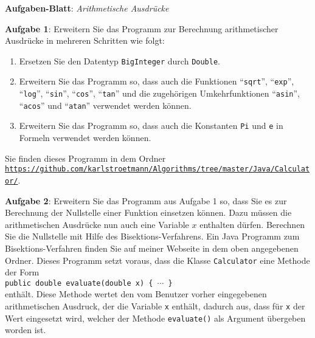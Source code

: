 \documentclass{article}
\begin{document}
\noindent
{\Large \textbf{Aufgaben-Blatt}: \emph{Arithmetische Ausdr\"ucke}}

\vspace{0.5cm}


\noindent
\textbf{Aufgabe 1}: 
Erweitern Sie das Programm zur Berechnung arithmetischer Ausdr\"ucke in mehreren 
Schritten wie folgt:
\begin{enumerate}
\item Ersetzen Sie den Datentyp \texttt{BigInteger} durch \texttt{Double}.
\item Erweitern Sie das Programm so, dass auch die
      Funktionen ``\texttt{sqrt}'', ``\texttt{exp}'', ``\texttt{log}'', ``\texttt{sin}'',
      ``\texttt{cos}'', ``\texttt{tan}'' und die zugeh\"origen Umkehrfunktionen 
      ``\texttt{asin}'', ``\texttt{acos}'' und ``\texttt{atan}''
      verwendet werden
      k\"onnen.
\item Erweitern Sie das Programm so, dass auch die Konstanten \texttt{Pi} und
      \texttt{e} in Formeln verwendet werden k\"onnen.
\end{enumerate}
Sie finden dieses Programm in dem Ordner
\\[0.2cm]
\hspace*{0.3cm}
\href{https://github.com/karlstroetmann/Algorithms/tree/master/Java/Calculator}{\texttt{https://github.com/karlstroetmann/Algorithms/tree/master/Java/Calculator/}}.
\vspace{0.5cm}

\noindent
\textbf{Aufgabe 2}: 
Erweitern Sie das Programm aus Aufgabe 1 so, dass Sie es zur Berechnung der Nullstelle
einer Funktion einsetzen k\"onnen.  Dazu m\"ussen die arithmetischen
Ausdr\"ucke nun auch eine Variable $x$ enthalten d\"urfen.  
Berechnen Sie die Nullstelle mit
Hilfe des Bisektions-Verfahrens.  Ein Java Programm zum Bisektions-Verfahren
 finden Sie auf meiner Webseite in dem oben angegebenen Ordner.
Dieses Programm setzt voraus, dass die Klasse \texttt{Calculator} eine Methode der Form
\\[0.2cm]
\hspace*{1.3cm}
\texttt{public double evaluate(double x) \{ $\cdots$ \} }
\\[0.2cm]
enth\"alt.  Diese Methode wertet den vom Benutzer vorher eingegebenen arithmetischen
Ausdruck, der die Variable \texttt{x} enth\"alt, dadurch aus, dass f\"ur \texttt{x}
der Wert eingesetzt wird, welcher der Methode \texttt{evaluate()} als Argument \"ubergeben
worden ist.
\end{document}
